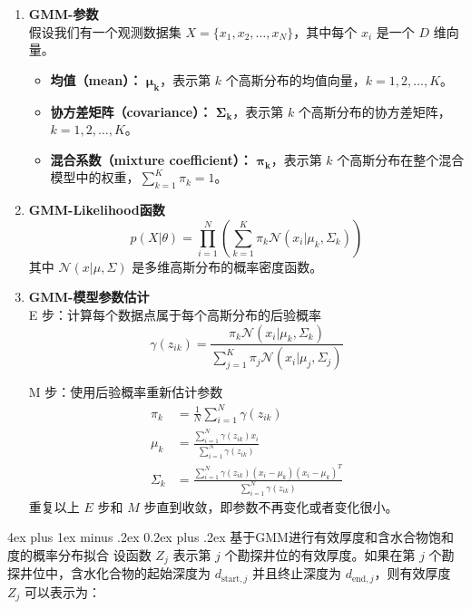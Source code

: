 \documentclass[12pt,a4paper]{nmmcm}
\makeatletter
\renewcommand\subsubsection{\@startsection{subsubsection}{3}{1em}%
  {4ex plus 1ex minus .2ex}%
  {0.2ex plus .2ex}%
  {\normalfont\large\bfseries}}
\makeatother
\begin{document}
\begin{enumerate}

  \item \textbf{GMM-参数} \\
        假设我们有一个观测数据集 $X = \{x_1, x_2, \ldots, x_N\}$，其中每个 $x_i$ 是一个 $D$ 维向量。
        \begin{itemize}
          \item \textbf{均值（mean）：} $\boldsymbol{\mu_k}$，表示第 $k$ 个高斯分布的均值向量，$k = 1, 2, \ldots, K$。
          \item \textbf{协方差矩阵（covariance）：} $\boldsymbol{\Sigma_k}$，表示第 $k$ 个高斯分布的协方差矩阵，$k = 1, 2, \ldots, K$。
          \item \textbf{混合系数（mixture coefficient）：} $\boldsymbol{\pi_k}$，表示第 $k$ 个高斯分布在整个混合模型中的权重，$\sum_{k=1}^K \pi_k = 1$。
        \end{itemize}

  \item \textbf{GMM-Likelihood函数} \\
        \[
          p(X | \theta) = \prod_{i=1}^N \left( \sum_{k=1}^K \pi_k \mathcal{N}(x_i | \mu_k, \Sigma_k) \right)
        \]
        其中 \( \mathcal{N}(x | \mu, \Sigma) \) 是多维高斯分布的概率密度函数。

  \item \textbf{GMM-模型参数估计} \\
        E 步：计算每个数据点属于每个高斯分布的后验概率
        \[
          \gamma(z_{ik}) = \frac{\pi_k \mathcal{N}(x_i | \mu_k, \Sigma_k)}{\sum_{j=1}^K \pi_j \mathcal{N}(x_i | \mu_j, \Sigma_j)}
        \]

        M 步：使用后验概率重新估计参数
        \begin{align*}
          \pi_k    & = \frac{1}{N} \sum_{i=1}^N \gamma(z_{ik})                                                      \\
          \mu_k    & = \frac{\sum_{i=1}^N \gamma(z_{ik}) x_i}{\sum_{i=1}^N \gamma(z_{ik})}                          \\
          \Sigma_k & = \frac{\sum_{i=1}^N \gamma(z_{ik}) (x_i - \mu_k)(x_i - \mu_k)^T}{\sum_{i=1}^N \gamma(z_{ik})}
        \end{align*}
        重复以上 $E$ 步和 $M$ 步直到收敛，即参数不再变化或者变化很小。
\end{enumerate}

\subsubsection{基于GMM进行有效厚度和含水合物饱和度的概率分布拟合}
设函数 \(Z_j\) 表示第 \(j\) 个勘探井位的有效厚度。如果在第 \(j\) 个勘探井位中，含水化合物的起始深度为 \(d_{\text{start}, j}\) 并且终止深度为 \(d_{\text{end}, j}\)，则有效厚度 \(Z_j\) 可以表示为：
\end{document}
